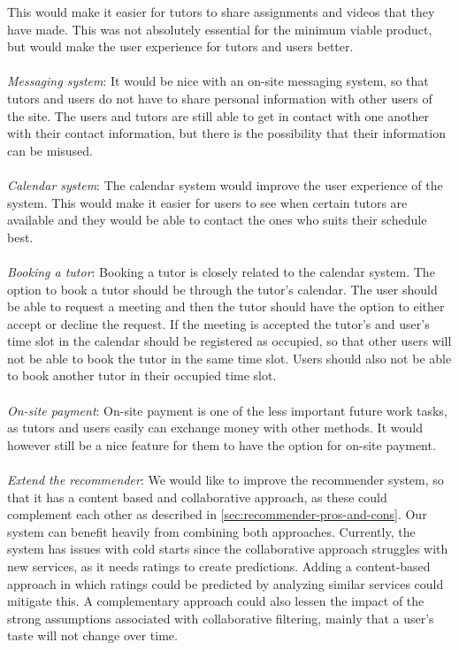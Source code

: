 This would make it easier for tutors to share assignments and videos that they have made. 
This was not absolutely essential for the minimum viable product, but would make the user experience for tutors and users better.
\\\\
\textit{Messaging system}: 
It would be nice with an on-site messaging system, so that tutors and users do not have to share personal information with other users of the site.
The users and tutors are still able to get in contact with one another with their contact information, but there is the possibility that their information can be misused.
\\\\
\textit{Calendar system}:
The calendar system would improve the user experience of the system. 
This would make it easier for users to see when certain tutors are available and they would be able to contact the ones who suits their schedule best.
\\\\
\textit{Booking a tutor}:
Booking a tutor is closely related to the calendar system.
The option to book a tutor should be through the tutor's calendar. 
The user should be able to request a meeting and then the tutor should have the option to either accept or decline the request.
If the meeting is accepted the tutor's and user's time slot in the calendar should be registered as occupied, so that other users will not be able to book the tutor in the same time slot.
Users should also not be able to book another tutor in their occupied time slot.
\\\\
\textit{On-site payment}:
On-site payment is one of the less important future work tasks, as tutors and users easily can exchange money with other methods.
It would however still be a nice feature for them to have the option for on-site payment.
\\\\
\textit{Extend the recommender}:
We would like to improve the recommender system, so that it has a content based and collaborative approach, as these could complement each other as described in \autoref{sec:recommender-pros-and-cons}.
Our system can benefit heavily from combining both approaches.
Currently, the system has issues with cold starts since the collaborative approach struggles with new services, as it needs ratings to create predictions.
Adding a content-based approach in which ratings could be predicted by analyzing similar services could mitigate this.
A complementary approach could also lessen the impact of the strong assumptions associated with collaborative filtering, mainly that a user's taste will not change over time.
